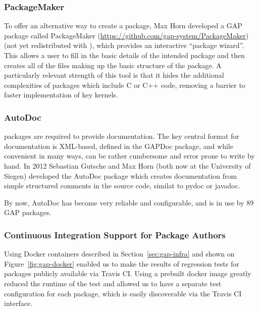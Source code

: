 \subsubsection{PackageMaker}
To offer an alternative way to create a package,
Max Horn developed a GAP package called {\sf PackageMaker}
(\url{https://github.com/gap-system/PackageMaker}) (not yet redistributed with \GAP),
which provides an interactive  ``package wizard''. This allows a
user to fill in the basic details 
of the intended package and then creates all of the files making up
the basic structure of the package. A particularly relevant
strength of this tool is that it hides the additional complexities of
packages which include C or C++ code, removing a barrier to faster implementation
of key kernels.

\subsubsection{AutoDoc}
\GAP packages are required to provide documentation.  The key central
format for \GAP documentation is XML-based, defined in the {\sf
  GAPDoc} package, and while convenient in many ways, can be rather
cumbersome and error prone to write by hand.
In 2012 Sebastian Gutsche 
and Max Horn (both now at the University of Siegen) developed the 
{\sf AutoDoc} package \cite{autodoc} which creates
documentation from simple structured comments in the source code,
similat to pydoc or javadoc.

By now, {\sf AutoDoc} has become very reliable and configurable, and
is in use by 89 GAP packages.
%
%

\subsubsection{Continuous Integration Support for Package Authors}
Using Docker containers described in Section~\ref{sec:gap-infra}
and shown on Figure~\ref{fig:gap-docker} enabled us to make the
results of regression tests for \GAP packages publicly
available via Travis CI. Using a prebuilt docker image 
greatly reduced the runtime of the test and allowed us to
have a separate test configuration for each package,
which is easily discoverable via the Travis CI interface.

